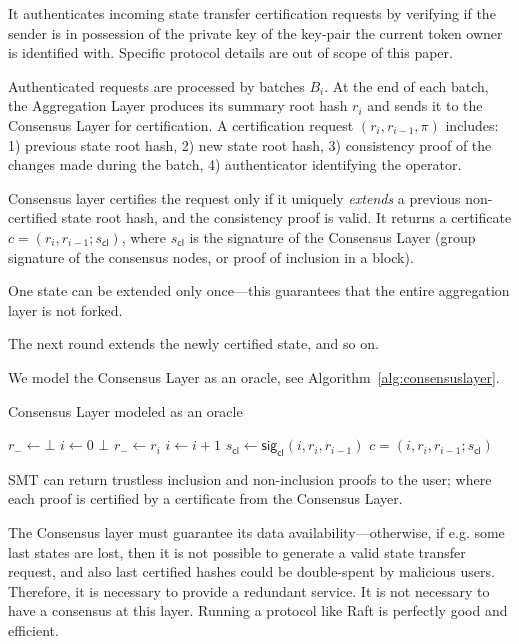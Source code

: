 \documentclass[twocolumn]{article}
\begin{document}
It authenticates incoming state transfer certification requests by verifying if the sender is in possession of the private key of the key-pair the current token owner is identified with. Specific protocol details are out of scope of this paper.

Authenticated requests are processed by batches $B_i$. At the end of each batch, the Aggregation Layer produces its summary root hash $r_i$ and sends it to the Consensus Layer for certification. A certification request $(r_i, r_{i-1}, \pi)$ includes: 1) previous state root hash, 2) new state root hash, 3) consistency proof of the changes made during the batch, 4) authenticator identifying the operator.

Consensus layer certifies the request only if it uniquely \textit{extends} a previous non-certified state root hash, and the consistency proof is valid. It returns a certificate $c = (r_i, r_{i-1}; s_{\textsf{cl}})$, where $s_{\textsf{cl}}$ is the signature of the Consensus Layer (group signature of the consensus nodes, or proof of inclusion in a block).

One state can be extended only once---this guarantees that the entire aggregation layer is not forked.

The next round extends the newly certified state, and so on.

We model the Consensus Layer as an oracle, see Algorithm~\ref{alg:consensuslayer}.

\begin{algorithm}[tbh]
  \caption{Consensus Layer modeled as an oracle}\label{alg:consensuslayer}
  \begin{algorithmic}[0]
        \State $r_- \gets \bot$
        \State $i \gets 0$
    \EndFunction
            \State \Return $\bot$
        \EndIf
        \State $r_- \gets r_i$
        \State $i \gets i+1$
        \State $s_{\textsf{cl}} \gets \textsf{sig}_\textsf{cl}(i, r_i, r_{i-1})$
        \State \Return $c = (i, r_i, r_{i-1}; s_{\textsf{cl}})$
    \EndFunction
  \end{algorithmic}
\end{algorithm}


SMT can return trustless inclusion and non-inclusion proofs to the user; where each proof is certified by a certificate from the Consensus Layer.

The Consensus layer must guarantee its data availability---otherwise, if e.g. some last states are lost, then it is not possible to generate a valid state transfer request, and also last certified hashes could be double-spent by malicious users. Therefore, it is necessary to provide a redundant service. It is not necessary to have a consensus at this layer. Running a protocol like Raft is perfectly good and efficient.
\end{document}
